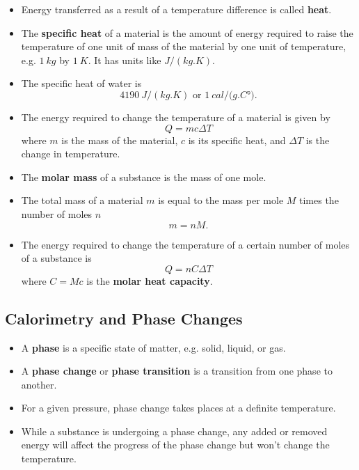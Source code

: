 \documentclass{article}
\begin{document}
\begin{itemize}
  \item Energy transferred as a result of a temperature difference is called \textbf{heat}.

  \item The \textbf{specific heat} of a material is the amount of energy required to raise the temperature of one unit of mass of the material by one unit of temperature, e.g. $\qty{1}{kg}$ by $\qty{1}{K}$. It has units like $\unit{J/(kg.K)}$.

  \item The specific heat of water is \[\qty{4190}{J/(kg.K)} \text{ or } \qty{1}{cal / (g.C\degree)}.\]

  \item The energy required to change the temperature of a material is given by \[Q = m c \Delta T\] where $m$ is the mass of the material, $c$ is its specific heat, and $\Delta T$ is the change in temperature.

  \item The \textbf{molar mass} of a substance is the mass of one mole.

  \item The total mass of a material $m$ is equal to the mass per mole $M$ times the number of moles $n$ \[m = n M.\]

  \item The energy required to change the temperature of a certain number of moles of a substance is \[Q = n C \Delta T\] where $C = M c$ is the \textbf{molar heat capacity}.
\end{itemize}

\subsection{Calorimetry and Phase Changes}

\begin{itemize}
  \item A \textbf{phase} is a specific state of matter, e.g. solid, liquid, or gas.

  \item A \textbf{phase change} or \textbf{phase transition} is a transition from one phase to another.

  \item For a given pressure, phase change takes places at a definite temperature.

  \item While a substance is undergoing a phase change, any added or removed energy will affect the progress of the phase change but won't change the temperature.
\end{itemize}
\end{document}
